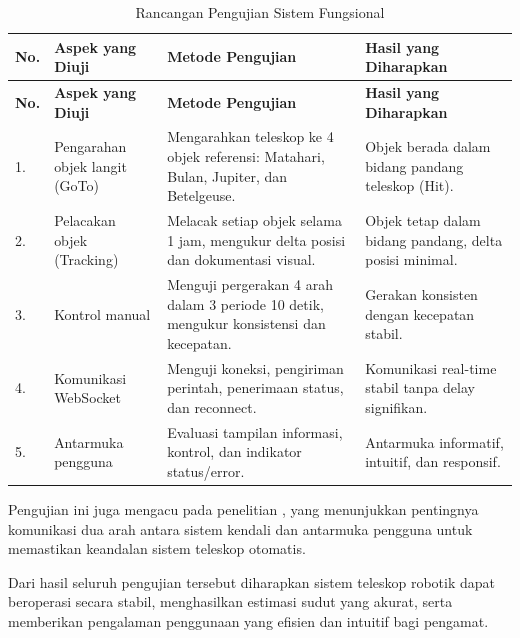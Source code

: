 \begin{longtable}{|b{}|p{}|p{}|p{}|}
	\caption{Rancangan Pengujian Sistem Fungsional}
	\label{table:3.ujiSoftware}\\
	\hline
	\textbf{No.} & \textbf{Aspek yang Diuji} & \textbf{Metode Pengujian} & \textbf{Hasil yang Diharapkan} \\
	\hline
	\endfirsthead
	\hline
	\textbf{No.} & \textbf{Aspek yang Diuji} & \textbf{Metode Pengujian} & \textbf{Hasil yang Diharapkan} \\
	\hline
	\endhead
	
	1. & Pengarahan objek langit (GoTo) & Mengarahkan teleskop ke 4 objek referensi: Matahari, Bulan, Jupiter, dan Betelgeuse. & Objek berada dalam bidang pandang teleskop (Hit). \\
	\hline
	2. & Pelacakan objek (Tracking) & Melacak setiap objek selama 1 jam, mengukur delta posisi dan dokumentasi visual. & Objek tetap dalam bidang pandang, delta posisi minimal. \\
	\hline
	3. & Kontrol manual & Menguji pergerakan 4 arah dalam 3 periode 10 detik, mengukur konsistensi dan kecepatan. & Gerakan konsisten dengan kecepatan stabil. \\
	\hline
	4. & Komunikasi WebSocket & Menguji koneksi, pengiriman perintah, penerimaan status, dan reconnect. & Komunikasi real-time stabil tanpa delay signifikan. \\
	\hline
	5. & Antarmuka pengguna & Evaluasi tampilan informasi, kontrol, dan indikator status/error. & Antarmuka informatif, intuitif, dan responsif. \\
	\hline
\end{longtable}

Pengujian ini juga mengacu pada penelitian \cite{Hoang2020,Malasan2025}, yang menunjukkan pentingnya komunikasi dua arah antara sistem kendali dan antarmuka pengguna untuk memastikan keandalan sistem teleskop otomatis.


Dari hasil seluruh pengujian tersebut diharapkan sistem teleskop robotik dapat beroperasi secara stabil, menghasilkan estimasi sudut yang akurat, serta memberikan pengalaman penggunaan yang efisien dan intuitif bagi pengamat.
